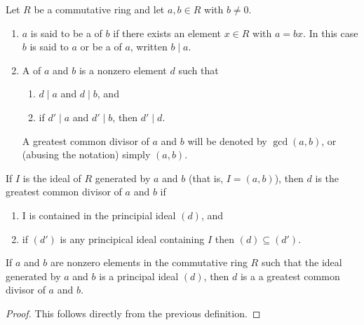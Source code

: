     \begin{definition}
        Let $R$ be a commutative ring and let $a,b \in R$ with $b \neq 0$.
        \begin{enumerate}[label = (\arabic*)]
            \item $a$ is said to be a  of $b$ if there exists an element $x \in R$ with $a = bx$. In this case $b$ is said to  $a$ or be a  of $a$, written $b \mid a$.
            \item A  of $a$ and $b$ is a nonzero element $d$ such that 
                \begin{enumerate}[label = (\roman*)]
                    \item $d \mid a$ and $d \mid b$, and
                    \item if $d' \mid a$ and $d' \mid b$, then $d' \mid d$.
                \end{enumerate}
            A greatest common divisor of $a$ and $b$ will be denoted by $\gcd{(a,b)}$, or (abusing the notation) simply $(a,b)$.
        \end{enumerate}
    \end{definition}

    \begin{definition}
        If $I$ is the ideal of $R$ generated by $a$ and $b$ (that is, $I = (a,b)$), then $d$ is the greatest common divisor of $a$ and $b$ if
            \begin{enumerate}[label = (\roman*)]
                \item I is contained in the principial ideal $(d)$, and
                \item if $(d')$ is any principical ideal containing $I$ then $(d) \subseteq (d')$.
            \end{enumerate}
    \end{definition}

    \begin{proposition}
        If $a$ and $b$ are nonzero elements in the commutative ring $R$ such that the ideal generated by $a$ and $b$ is a principal ideal $(d)$, then $d$ is a a greatest common divisor of $a$ and $b$.
    \end{proposition}
        \begin{proof}
            This follows directly from the previous definition.
        \end{proof}
    
